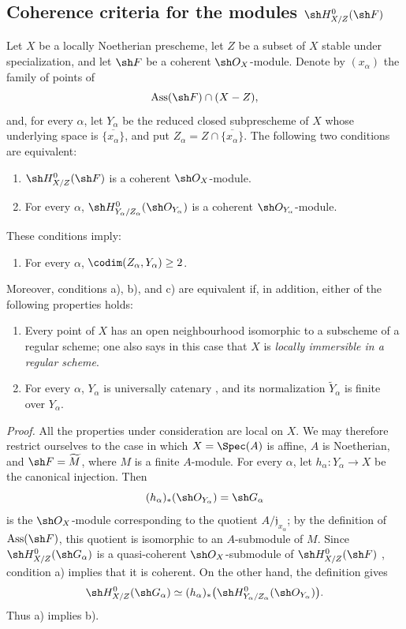 
\subsection{Coherence criteria for the modules
\texorpdfstring{$\sh H^0_{X/Z}(\sh F)$}{H0(X/Z,F)}}
\label{subsection:IV.5.11}

\begin{proposition}[5.11.1]
\label{IV.5.11.1}
Let $X$ be a locally Noetherian prescheme, let $Z$ be a subset of
$X$ stable under specialization, and let $\sh F$ be a coherent
$\sh O_X$-module.  Denote by $(x_\alpha)$ the family of points of
\[
  \operatorname{Ass}(\sh F)\cap(X-Z),
\]
and, for every $\alpha$, let $Y_\alpha$ be the reduced closed
subprescheme of $X$ whose underlying space is
$\overline{\{x_\alpha\}}$, and put
$Z_\alpha=Z\cap\overline{\{x_\alpha\}}$.  The following two
conditions are equivalent:
\begin{enumerate}[{\rm a)}]
  \item $\sh H^0_{X/Z}(\sh F)$ is a coherent $\sh O_X$-module.
  \item For every $\alpha$,
  $\sh H^0_{Y_\alpha/Z_\alpha}(\sh O_{Y_\alpha})$ is a coherent
  $\sh O_{Y_\alpha}$-module.
\end{enumerate}
These conditions imply:
\begin{enumerate}
  \item[{\rm c)}] For every $\alpha$,
  $\codim(Z_\alpha,Y_\alpha)\geq2$.
\end{enumerate}
Moreover, conditions {\rm a)}, {\rm b)}, and {\rm c)} are
equivalent if, in addition, either of the following properties
holds:
\begin{enumerate}[{\rm(i)}]
  \item Every point of $X$ has an open neighbourhood isomorphic
  to a subscheme of a regular scheme; one also says in this case
  that $X$ is \emph{locally immersible in a regular scheme}.
  \item For every $\alpha$, $Y_\alpha$ is universally catenary
  , and its normalization
  $\widetilde Y_\alpha$  is finite over
  $Y_\alpha$.
\end{enumerate}
\end{proposition}

\noindent\emph{Proof.}\quad
All the properties under consideration are local on $X$.  We may
therefore restrict ourselves to the case in which
$X=\Spec(A)$ is affine, $A$ is Noetherian, and
$\sh F=\widetilde M$, where $M$ is a finite $A$-module.  For
every $\alpha$, let $h_\alpha:Y_\alpha\to X$ be the canonical
injection.  Then
\[
  (h_\alpha)_*(\sh O_{Y_\alpha})=\sh G_\alpha
\]
is the $\sh O_X$-module corresponding to the quotient
$A/\mathfrak j_{x_\alpha}$; by the definition of
$\operatorname{Ass}(\sh F)$, this quotient is isomorphic to an
$A$-submodule of $M$.  Since
$\sh H^0_{X/Z}(\sh G_\alpha)$ is a quasi-coherent
$\sh O_X$-submodule of $\sh H^0_{X/Z}(\sh F)$
, condition {\rm a)} implies that it is coherent.
On the other hand, the definition  gives
\[
  \sh H^0_{X/Z}(\sh G_\alpha)
  \simeq
  (h_\alpha)_*
  \bigl(\sh H^0_{Y_\alpha/Z_\alpha}(\sh O_{Y_\alpha})\bigr).
\]
Thus {\rm a)} implies {\rm b)}.

